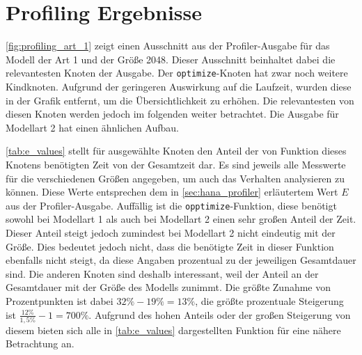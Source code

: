 \section{Profiling Ergebnisse}
\autoref{fig:profiling_art_1} zeigt einen Ausschnitt aus der Profiler-Ausgabe
für das Modell der Art 1 und der Größe 2048. Dieser Ausschnitt beinhaltet dabei
die relevantesten Knoten der Ausgabe. Der \verb+optimize+-Knoten
hat zwar noch weitere Kindknoten. Aufgrund der geringeren Auswirkung auf die
Laufzeit, wurden diese in der Grafik entfernt, um die Übersichtlichkeit zu
erhöhen. Die relevantesten von diesen Knoten werden jedoch im folgenden weiter
betrachtet. Die Ausgabe für Modellart 2 hat einen ähnlichen Aufbau.

\autoref{tab:e_values} stellt für ausgewählte Knoten den Anteil der von
Funktion dieses Knotens benötigten Zeit von der Gesamtzeit dar. Es sind jeweils
alle Messwerte für die verschiedenen Größen angegeben, um auch das Verhalten
analysieren zu können. Diese Werte entsprechen dem in
\autoref{sec:hana_profiler} erläutertem Wert $E$ aus der Profiler-Ausgabe.
Auffällig ist die \verb+opptimize+-Funktion, diese benötigt sowohl bei
Modellart 1 als auch bei Modellart 2 einen sehr großen Anteil der Zeit. Dieser
Anteil steigt jedoch zumindest bei Modellart 2 nicht eindeutig mit der Größe. Dies
bedeutet jedoch nicht, dass die benötigte Zeit in dieser Funktion ebenfalls
nicht steigt, da diese Angaben prozentual zu der jeweiligen Gesamtdauer sind.
Die anderen Knoten sind deshalb interessant, weil der Anteil an der Gesamtdauer
mit der Größe des Modells zunimmt. Die größte Zunahme von Prozentpunkten ist
dabei $32 \% - 19 \% = 13 \%$, die größte prozentuale Steigerung ist
$\frac{12\%}{1,5\%} - 1 = 700\%$. Aufgrund des hohen Anteils oder der großen
Steigerung von diesem bieten sich alle in \autoref{tab:e_values} dargestellten
Funktion für eine nähere Betrachtung an.

\begin{table}[h]
\centering
{}
\caption{Anteil an der Gesamtlaufzeit ausgewählter Knoten}\label{tab:e_values}
\end{table}
